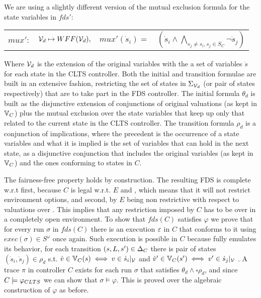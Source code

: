 We are using a slightly different version of the mutual exclusion formula for the state variables in $fds'$:

\begin{center}
	\begin{tabular}{r r r l}
		$mux':$&${\mathcal{V}}_d \mapsto WFF({\mathcal{V}}_d),$&$mux'(\dot{s}_i) = $&$(\dot{s}_i \wedge\bigwedge_{s_j \neq s_i, s_j \in S_C}\neg \dot{s}_j)$
	\end{tabular}
\end{center}

Where ${\mathcal{V}}_d$ is the extension of the original variables with the a set of variables $\dot{s}$ for each state in the CLTS controller. Both the initial and transition formulae are built in an extensive fashion, restricting the set of states in $\Sigma_{{\mathcal{V}}_d}$ (or pair of states respectively) that are to take part in the FDS controller. The initial formula $\theta_d$ is built as the disjunctive extension of conjunctions of original valuations (as kept in $\mathbb{V}_C$) plus the mutual exclusion over the state variables that keep up only that related to the current state in the CLTS controller. The transition formula $\rho_d$ is a conjunction of implications, where the precedent is the occurrence of a state variables and what it is implied is the set of variables that can hold in the next state, as a disjunctive conjunction that includes the original variables (as kept in $\mathbb{V}_C$) and the ones conforming to states in $C$.

The fairness-free property holds by construction. The resulting FDS is complete w.r.t \gsX first, because $C$ is legal w.r.t. $E$ and \controlSet, which means that it will not restrict environment options, and second, by $E$ being non restrictive with respect to valuations over \gsV. This implies that any restriction imposed by $C$ has to be over \gsY in a completely open environment.
To show that $fds(C)$ satisfies $\varphi$  we prove that for every run $\sigma$ in $fds(C)$ there is an execution $\varepsilon$ in $C$ that conforms to it using $exec(\sigma) \in S^{\omega}$ once again. Such execution is possible in $C$ because \fdsD fully emulates its behavior, for each transition $(s,L, s')\in \Delta_C$ there is pair of states $(\dot{s}_i,\dot{s}_j) \in \rho_d$ s.t. $\dot{v} \in \mathbb{V}_C(s) \iff v \in \dot{s}_i|_{{\mathcal{V}}}$ and $\dot{v}' \in \mathbb{V}_C(s') \iff v' \in \dot{s}_j|_{{\mathcal{V}}}$ .
A trace $\pi$ in controller $C$ exists for each run $\sigma$ that satisfies $\theta_d \wedge \square \rho_d$, and since $C \models \varphi_{CLTS}$ we can show that $\sigma \models \varphi$. This is proved over the algebraic construction of $\varphi$ as before.
